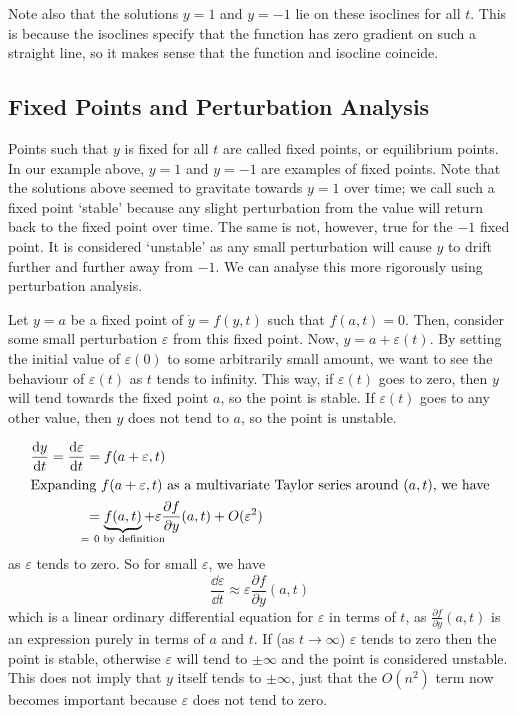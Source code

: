 \documentclass{article}
\begin{document}
	Note also that the solutions $y = 1$ and $y = -1$ lie on these isoclines for all $t$. This is because the isoclines specify that the function has zero gradient on such a straight line, so it makes sense that the function and isocline coincide.

	\subsection{Fixed Points and Perturbation Analysis}
	Points such that $y$ is fixed for all $t$ are called fixed points, or equilibrium points. In our example above, $y=1$ and $y=-1$ are examples of fixed points. Note that the solutions above seemed to gravitate towards $y=1$ over time; we call such a fixed point `stable' because any slight perturbation from the value will return back to the fixed point over time. The same is not, however, true for the $-1$ fixed point. It is considered `unstable' as any small perturbation will cause $y$ to drift further and further away from $-1$. We can analyse this more rigorously using perturbation analysis.

	Let $y = a$ be a fixed point of $\dot y = f(y, t)$ such that $f(a, t) = 0$. Then, consider some small perturbation $\varepsilon$ from this fixed point. Now, $y = a + \varepsilon(t)$. By setting the initial value of $\varepsilon(0)$ to some arbitrarily small amount, we want to see the behaviour of $\varepsilon(t)$ as $t$ tends to infinity. This way, if $\varepsilon(t)$ goes to zero, then $y$ will tend towards the fixed point $a$, so the point is stable. If $\varepsilon(t)$ goes to any other value, then $y$ does not tend to $a$, so the point is unstable.

	\begin{align*}
		\frac{\dd y}{\dd t} = \frac{\dd \varepsilon}{\dd t} &= f(a + \varepsilon, t) \\
		\intertext{Expanding $f(a + \varepsilon, t)$ as a multivariate Taylor series around $(a, t)$, we have}
		&= \underbrace{f(a, t)}_{\mathclap{=\ 0\text{ by definition}}} + \varepsilon \frac{\partial f}{\partial y}(a, t) + O(\varepsilon^2)
	\end{align*}
	as $\varepsilon$ tends to zero. So for small $\varepsilon$, we have
	\[ \frac{\dd \varepsilon}{\dd t} \approx \varepsilon \frac{\partial f}{\partial y}(a, t) \]
	which is a linear ordinary differential equation for $\varepsilon$ in terms of $t$, as $\frac{\partial f}{\partial y}(a, t)$ is an expression purely in terms of $a$ and $t$. If (as $t \to \infty$) $\varepsilon$ tends to zero then the point is stable, otherwise $\varepsilon$ will tend to $\pm \infty$ and the point is considered unstable. This does not imply that $y$ itself tends to $\pm \infty$, just that the $O(n^2)$ term now becomes important because $\varepsilon$ does not tend to zero.
\end{document}
